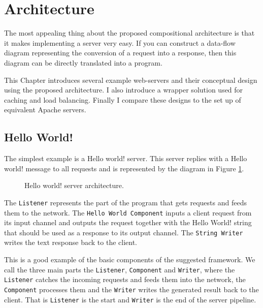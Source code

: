 \section{Architecture}
\label{sec:arch}
The most appealing thing about the proposed compositional architecture is that
it makes implementing a server very easy. If you can construct a data-flow diagram 
representing the conversion of a request into a response, then this diagram
can be directly translated into a program.

This Chapter introduces several example web-servers and their conceptual
design using the proposed architecture. I also introduce a wrapper 
solution used for caching and load balancing.
Finally I compare these designs to the set up of equivalent Apache servers.

\subsection{Hello World!}
\label{sec:helloWorld}
The simplest example is a Hello world! server. This server replies with a 
Hello world! message to all requests and is represented by the diagram
in Figure \ref{fig:helloWorld}.

\begin{figure}[h]
\centering
{}
\caption[scale=1.0]{Hello world! server architecture.}
\label{fig:helloWorld}
\end{figure}

The \texttt{Listener} represents the 
part of the program that gets requests and feeds them to the network.
The \texttt{Hello World Component} inputs a client request from its input channel
and outputs the request together with the Hello World! string that should be 
used as a response to its output channel.
The \texttt{String Writer} writes the text response back to the client.

This is a good example of the basic components of the suggested framework.
We call the three main parts the \texttt{Listener}, \texttt{Component} 
and \texttt{Writer}, where
the \texttt{Listener} catches the incoming requests and feeds them into the network,
the \texttt{Component} processes them and the \texttt{Writer} writes the generated result 
back to the client. That is \texttt{Listener} is the start and \texttt{Writer}
is the end of the server pipeline.

